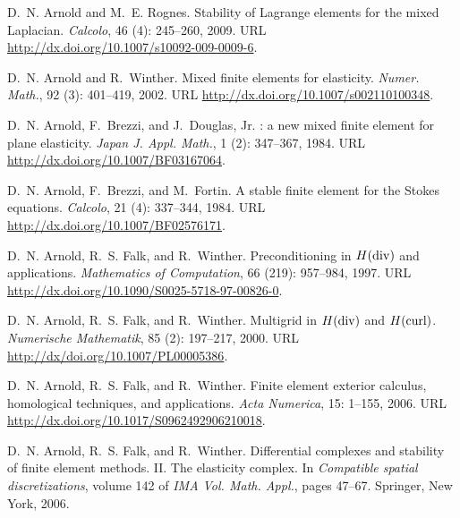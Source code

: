 \begin{thebibliography}{467}
D.~N. Arnold and M.~E. Rognes.
\newblock Stability of {L}agrange elements for the mixed {L}aplacian.
\newblock \emph{Calcolo}, 46 (4): 245--260, 2009.
\newblock URL \url{http://dx.doi.org/10.1007/s10092-009-0009-6}.

D.~N. Arnold and R.~Winther.
\newblock Mixed finite elements for elasticity.
\newblock \emph{Numer. Math.}, 92 (3): 401--419, 2002.
\newblock URL \url{http://dx.doi.org/10.1007/s002110100348}.

D.~N. Arnold, F.~Brezzi, and J.~Douglas, Jr.
: a new mixed finite element for plane elasticity.
\newblock \emph{Japan J. Appl. Math.}, 1 (2): 347--367,
  1984{}.
\newblock URL \url{http://dx.doi.org/10.1007/BF03167064}.

D.~N. Arnold, F.~Brezzi, and M.~Fortin.
\newblock A stable finite element for the {S}tokes equations.
\newblock \emph{Calcolo}, 21 (4): 337--344,
  1984{}.
\newblock URL \url{http://dx.doi.org/10.1007/BF02576171}.

D.~N. Arnold, R.~S. Falk, and R.~Winther.
\newblock Preconditioning in {$H({\rm div})$} and applications.
\newblock \emph{Mathematics of Computation}, 66 (219):
  957--984, 1997.
\newblock URL \url{http://dx.doi.org/10.1090/S0025-5718-97-00826-0}.

D.~N. Arnold, R.~S. Falk, and R.~Winther.
\newblock Multigrid in {$H({\rm div})$} and {$H(\rm curl)$}.
\newblock \emph{Numerische Mathematik}, 85 (2): 197--217,
  2000.
\newblock URL \url{http://dx/doi.org/10.1007/PL00005386}.

D.~N. Arnold, R.~S. Falk, and R.~Winther.
\newblock Finite element exterior calculus, homological techniques, and
  applications.
\newblock \emph{Acta Numerica}, 15: 1--155, 2006{}.
\newblock URL \url{http://dx.doi.org/10.1017/S0962492906210018}.

D.~N. Arnold, R.~S. Falk, and R.~Winther.
\newblock Differential complexes and stability of finite element methods. {II}.
  {T}he elasticity complex.
\newblock In \emph{Compatible spatial discretizations}, volume 142 of \emph{IMA
  Vol. Math. Appl.}, pages 47--67. Springer, New York, 2006{}.


\end{thebibliography}
